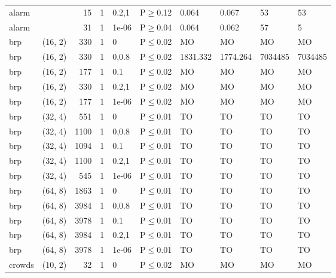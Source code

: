 \begin{longtable}{llrrllllll}
 alarm         &          &     	15 & 1 & 0.2,1 & P$\geq$0.12  & 0.064    & 0.067    & 53      & 53      \\
 alarm         &          &     	31 & 1 & 1e-06 & P$\geq$0.04  & 0.064    & 0.062    & 57      & 5       \\
 brp           & (16, 2)  &    	330 & 1 & 0     & P$\leq$0.02  & MO       & MO       & MO      & MO      \\
 brp           & (16, 2)  &    	330 & 1 & 0,0.8 & P$\leq$0.02  & 1831.332 & 1774.264 & 7034485 & 7034485 \\
 brp           & (16, 2)  &    	177 & 1 & 0.1   & P$\leq$0.02  & MO       & MO       & MO      & MO      \\
 brp           & (16, 2)  &    	330 & 1 & 0.2,1 & P$\leq$0.02  & MO       & MO       & MO      & MO      \\
 brp           & (16, 2)  &    	177 & 1 & 1e-06 & P$\leq$0.02  & MO       & MO       & MO      & MO      \\
 brp           & (32, 4)  &    	551 & 1 & 0     & P$\leq$0.01  & TO       & TO       & TO      & TO      \\
 brp           & (32, 4)  &   	1100 & 1 & 0,0.8 & P$\leq$0.01  & TO       & TO       & TO      & TO      \\
 brp           & (32, 4)  &   	1094 & 1 & 0.1   & P$\leq$0.01  & TO       & TO       & TO      & TO      \\
 brp           & (32, 4)  &   	1100 & 1 & 0.2,1 & P$\leq$0.01  & TO       & TO       & TO      & TO      \\
 brp           & (32, 4)  &    	545 & 1 & 1e-06 & P$\leq$0.01  & TO       & TO       & TO      & TO      \\
 brp           & (64, 8)  &   	1863 & 1 & 0     & P$\leq$0.01  & TO       & TO       & TO      & TO      \\
 brp           & (64, 8)  &   	3984 & 1 & 0,0.8 & P$\leq$0.01  & TO       & TO       & TO      & TO      \\
 brp           & (64, 8)  &   	3978 & 1 & 0.1   & P$\leq$0.01  & TO       & TO       & TO      & TO      \\
 brp           & (64, 8)  &   	3984 & 1 & 0.2,1 & P$\leq$0.01  & TO       & TO       & TO      & TO      \\
 brp           & (64, 8)  &   	3978 & 1 & 1e-06 & P$\leq$0.01  & TO       & TO       & TO      & TO      \\
 crowds        & (10, 2)  &     	32 & 1 & 0     & P$\leq$0.02  & MO       & MO       & MO      & MO      \\

\end{longtable}
